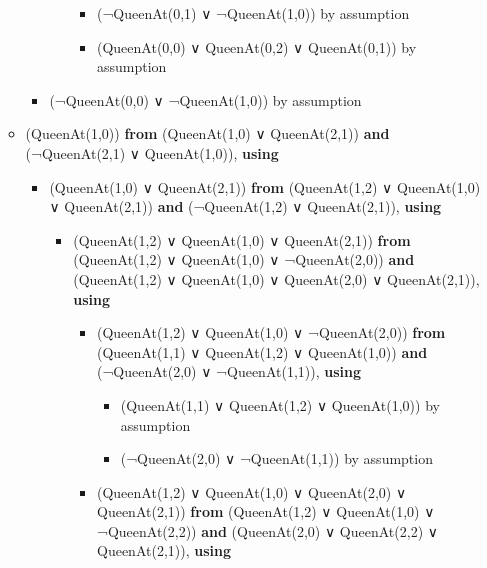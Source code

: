 \begin{itemize}
\begin{itemize}
\begin{itemize}
\begin{itemize}
        \begin{itemize}
        \tightlist
        \item
          (¬QueenAt(0,1) ∨ ¬QueenAt(1,0)) by assumption
        \item
          (QueenAt(0,0) ∨ QueenAt(0,2) ∨ QueenAt(0,1)) by assumption
        \end{itemize}
      \end{itemize}
    \item
      (¬QueenAt(0,0) ∨ ¬QueenAt(1,0)) by assumption
    \end{itemize}
  \item
    (QueenAt(1,0)) \textbf{from} (QueenAt(1,0) ∨ QueenAt(2,1))
    \textbf{and} (¬QueenAt(2,1) ∨ QueenAt(1,0)), \textbf{using}

    \begin{itemize}
    \tightlist
    \item
      (QueenAt(1,0) ∨ QueenAt(2,1)) \textbf{from} (QueenAt(1,2) ∨
      QueenAt(1,0) ∨ QueenAt(2,1)) \textbf{and} (¬QueenAt(1,2) ∨
      QueenAt(2,1)), \textbf{using}

      \begin{itemize}
      \tightlist
      \item
        (QueenAt(1,2) ∨ QueenAt(1,0) ∨ QueenAt(2,1)) \textbf{from}
        (QueenAt(1,2) ∨ QueenAt(1,0) ∨ ¬QueenAt(2,0)) \textbf{and}
        (QueenAt(1,2) ∨ QueenAt(1,0) ∨ QueenAt(2,0) ∨ QueenAt(2,1)),
        \textbf{using}

        \begin{itemize}
        \tightlist
        \item
          (QueenAt(1,2) ∨ QueenAt(1,0) ∨ ¬QueenAt(2,0)) \textbf{from}
          (QueenAt(1,1) ∨ QueenAt(1,2) ∨ QueenAt(1,0)) \textbf{and}
          (¬QueenAt(2,0) ∨ ¬QueenAt(1,1)), \textbf{using}

          \begin{itemize}
          \tightlist
          \item
            (QueenAt(1,1) ∨ QueenAt(1,2) ∨ QueenAt(1,0)) by assumption
          \item
            (¬QueenAt(2,0) ∨ ¬QueenAt(1,1)) by assumption
          \end{itemize}
        \item
          (QueenAt(1,2) ∨ QueenAt(1,0) ∨ QueenAt(2,0) ∨ QueenAt(2,1))
          \textbf{from} (QueenAt(1,2) ∨ QueenAt(1,0) ∨ ¬QueenAt(2,2))
          \textbf{and} (QueenAt(2,0) ∨ QueenAt(2,2) ∨ QueenAt(2,1)),
          \textbf{using}


\end{itemize}
\end{itemize}
\end{itemize}
\end{itemize}
\end{itemize}
